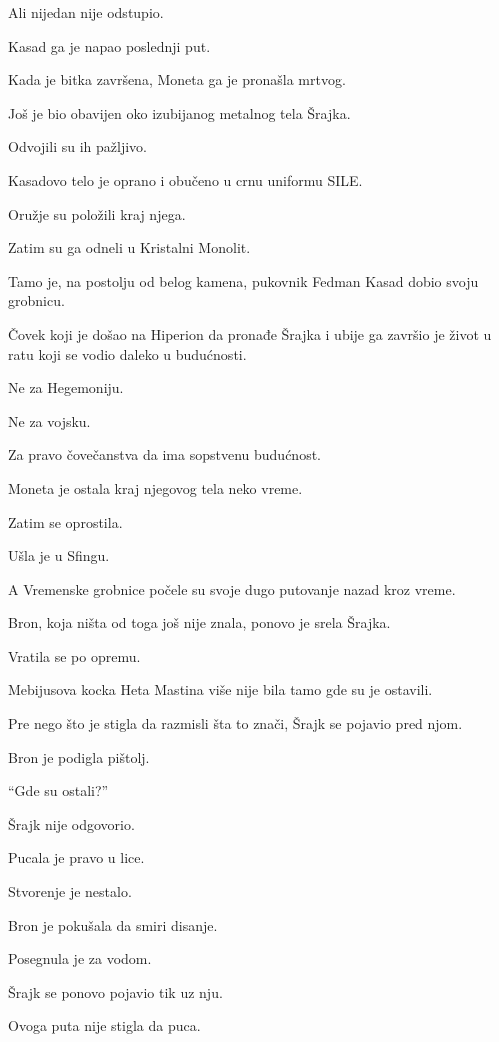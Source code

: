 Ali nijedan nije odstupio.

Kasad ga je napao poslednji put.

\bigskip

Kada je bitka završena, Moneta ga je pronašla mrtvog.

Još je bio obavijen oko izubijanog metalnog tela Šrajka.

Odvojili su ih pažljivo.

Kasadovo telo je oprano i obučeno u crnu uniformu SILE.

Oružje su položili kraj njega.

Zatim su ga odneli u Kristalni Monolit.

Tamo je, na postolju od belog kamena, pukovnik Fedman Kasad dobio svoju grobnicu.

Čovek koji je došao na Hiperion da pronađe Šrajka i ubije ga završio je život u ratu koji se vodio daleko u budućnosti.

Ne za Hegemoniju.

Ne za vojsku.

Za pravo čovečanstva da ima sopstvenu budućnost.

\bigskip

Moneta je ostala kraj njegovog tela neko vreme.

Zatim se oprostila.

Ušla je u Sfingu.

A Vremenske grobnice počele su svoje dugo putovanje nazad kroz vreme.

\bigskip

Bron, koja ništa od toga još nije znala, ponovo je srela Šrajka.

Vratila se po opremu.

Mebijusova kocka Heta Mastina više nije bila tamo gde su je ostavili.

Pre nego što je stigla da razmisli šta to znači, Šrajk se pojavio pred njom.

Bron je podigla pištolj.

``Gde su ostali?''

Šrajk nije odgovorio.

Pucala je pravo u lice.

Stvorenje je nestalo.

Bron je pokušala da smiri disanje.

Posegnula je za vodom.

Šrajk se ponovo pojavio tik uz nju.

Ovoga puta nije stigla da puca.

